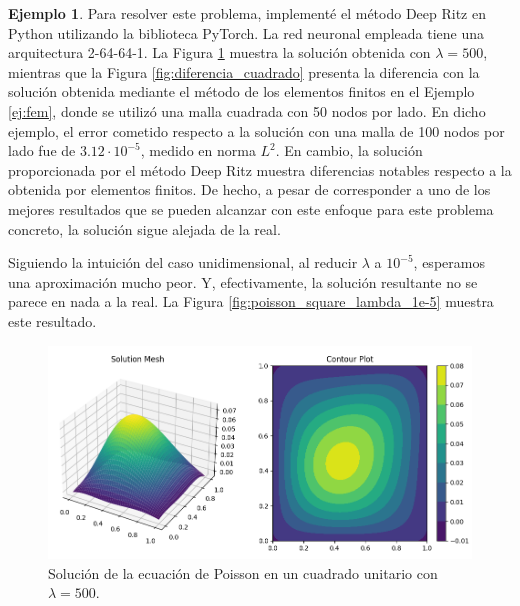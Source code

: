 \documentclass[a4paper,11pt,spanish, twoside, leqno]{tfg-uam}
\theoremstyle{definition}
\newtheorem{exmp}[teor]{Ejemplo}
\begin{document}
\begin{mdframed}
\begin{exmp}
        Para resolver este problema, implementé el método Deep Ritz en Python utilizando la biblioteca PyTorch. La red neuronal empleada tiene una arquitectura 2-64-64-1. La Figura \ref{fig:poisson_square} muestra la solución obtenida con $\lambda = 500$, mientras que la Figura \ref{fig:diferencia_cuadrado} presenta la diferencia con la solución obtenida mediante el método de los elementos finitos en el Ejemplo \ref{ej:fem}, donde se utilizó una malla cuadrada con 50 nodos por lado. En dicho ejemplo, el error cometido respecto a la solución con una malla de 100 nodos por lado fue de $3.12 \cdot 10^{-5}$, medido en norma $L^2$. En cambio, la solución proporcionada por el método Deep Ritz muestra diferencias notables respecto a la obtenida por elementos finitos. De hecho, a pesar de corresponder a uno de los mejores resultados que se pueden alcanzar con este enfoque para este problema concreto, la solución sigue alejada de la real.

        Siguiendo la intuición del caso unidimensional, al reducir $\lambda$ a $10^{-5}$, esperamos una aproximación mucho peor. Y, efectivamente, la solución resultante no se parece en nada a la real. La Figura \ref{fig:poisson_square_lambda_1e-5} muestra este resultado.

        \begin{figure}[H]
            \centering
            \includegraphics[width=1\textwidth]{Figuras/PoissonSquareBien.png}
            \caption{Solución de la ecuación de Poisson en un cuadrado unitario con $\lambda = 500$.}
            \label{fig:poisson_square}
        \end{figure}


\end{exmp}
\end{mdframed}
\end{document}
